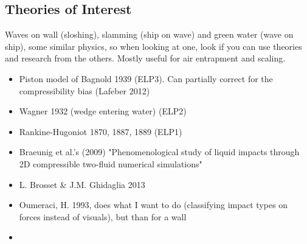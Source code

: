 \subsection{Theories of Interest}
Waves on wall (sloshing), slamming (ship on wave) and green water (wave on ship), some similar physics, so when looking at one, look if you can use theories and research from the others. Mostly useful for air entrapment and scaling. 


\begin{itemize}
	\item Piston model of Bagnold 1939 (ELP3). Can partially correct for the compressibility bias (Lafeber 2012) 
	\item Wagner 1932 (wedge entering water) (ELP2)
	\item Rankine-Hugoniot 1870, 1887, 1889 (ELP1)
	\item Braeunig et al.’s (2009) "Phenomenological study of liquid impacts through 2D compressible two-fluid numerical simulations"
	\item L. Brosset \& J.M. Ghidaglia 2013
	\item Oumeraci, H. 1993, does what I want to do (classifying impact types on forces instead of visuals), but than for a wall
	\item 
	
\end{itemize}

